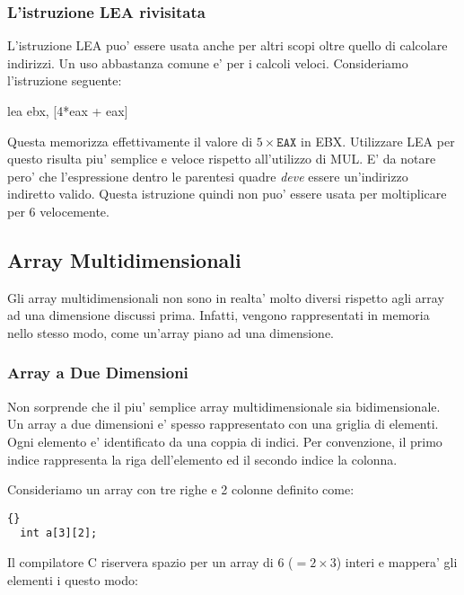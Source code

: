 \subsubsection{L'istruzione {\code LEA} rivisitata}

L'istruzione {\code LEA} puo' essere usata anche per altri scopi oltre
quello di calcolare indirizzi. Un uso abbastanza comune e' per i
calcoli veloci. Consideriamo l'istruzione seguente:
\begin{AsmCodeListing}[numbers=none,frame=none]
      lea    ebx, [4*eax + eax]
\end{AsmCodeListing}
Questa memorizza effettivamente il valore di $5 \times \mathtt{EAX}$ in
EBX. Utilizzare {\code LEA} per questo risulta piu' semplice e veloce
rispetto all'utilizzo di {\code MUL}. E' da notare pero' che
l'espressione dentro le parentesi quadre \emph{deve} essere un'indirizzo
indiretto valido. Questa istruzione quindi non puo' essere usata per
moltiplicare per 6 velocemente.


\subsection{Array Multidimensionali}

Gli array multidimensionali non sono in realta' molto diversi rispetto
agli array ad una dimensione discussi prima. Infatti, vengono rappresentati
in memoria nello stesso modo, come un'array piano ad una dimensione.

\subsubsection{Array a Due Dimensioni}
Non sorprende che il piu' semplice array multidimensionale sia bidimensionale.
Un array a due dimensioni e' spesso rappresentato con una griglia di elementi.
Ogni elemento e' identificato da una coppia di indici. Per convenzione, il
primo indice rappresenta la riga dell'elemento ed il secondo indice la
colonna.

Consideriamo un array con tre righe e 2 colonne definito come:
\begin{lstlisting}[stepnumber=0]{}
  int a[3][2];
\end{lstlisting}
Il compilatore C riservera spazio per un array di 6 ($= 2 \times 3$) interi
e mappera' gli elementi i  questo modo:

